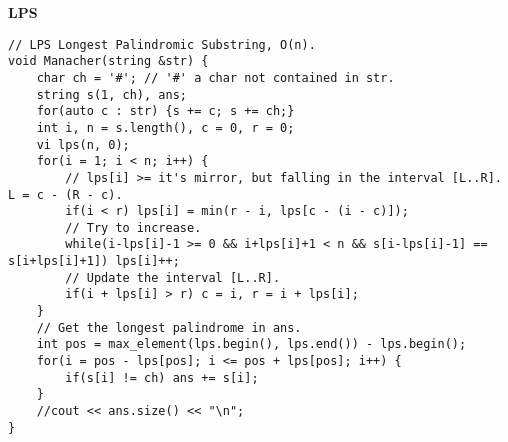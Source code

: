 \documentclass[a4paper,10pt]{article}
\newcommand{\titleAlg}[1]{\vspace{-10pt}
\begin{center}\textbf{#1}\end{center} \vspace{-10pt}}
\begin{document}
\titleAlg{LPS}
\begin{multicols}{2}
\begin{verbatim}
// LPS Longest Palindromic Substring, O(n).
void Manacher(string &str) {
    char ch = '#'; // '#' a char not contained in str.
    string s(1, ch), ans;
    for(auto c : str) {s += c; s += ch;}
    int i, n = s.length(), c = 0, r = 0;
    vi lps(n, 0);
    for(i = 1; i < n; i++) {
        // lps[i] >= it's mirror, but falling in the interval [L..R]. L = c - (R - c).
        if(i < r) lps[i] = min(r - i, lps[c - (i - c)]);
        // Try to increase.
        while(i-lps[i]-1 >= 0 && i+lps[i]+1 < n && s[i-lps[i]-1] == s[i+lps[i]+1]) lps[i]++;
        // Update the interval [L..R].
        if(i + lps[i] > r) c = i, r = i + lps[i];
    }
    // Get the longest palindrome in ans.
    int pos = max_element(lps.begin(), lps.end()) - lps.begin();
    for(i = pos - lps[pos]; i <= pos + lps[pos]; i++) {
        if(s[i] != ch) ans += s[i];
    }
    //cout << ans.size() << "\n";
}
\end{verbatim}
\end{multicols}
\end{document}

